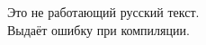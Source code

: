 \documentclass{article}
\begin{document}
Это не работающий русский текст.\\ Выдаёт ошибку при компиляции.
\end{document}
